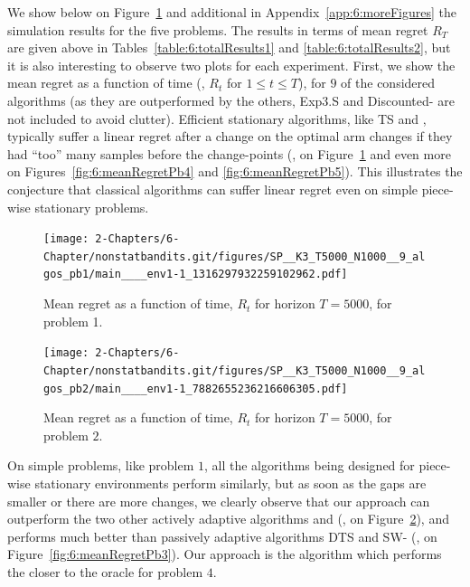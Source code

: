 We show below on Figure~\ref{fig:6:meanRegretPb1} and additional in Appendix~\ref{app:6:moreFigures} the simulation results for the five problems.
The results in terms of mean regret $R_T$ are given above in Tables~\ref{table:6:totalResults1} and \ref{table:6:totalResults2}, but it is also interesting to observe two plots for each experiment.
%
First, we show the mean regret as a function of time (\ie, $R_t$ for $1 \leq t \leq T$), for $9$ of the considered algorithms (as they are outperformed by the others, Exp3.S and Discounted-\klUCB{} are not included to avoid clutter).
%
Efficient stationary algorithms, like TS and \klUCB, typically suffer a linear regret after a change on the optimal arm changes if they had ``too'' many samples before the change-points (\eg, on Figure~\ref{fig:6:meanRegretPb1} and even more on Figures~\ref{fig:6:meanRegretPb4} and \ref{fig:6:meanRegretPb5}).
This illustrates the conjecture that classical algorithms can suffer linear regret even on simple piece-wise stationary problems.


\begin{figure}[h!]  %
    \centering
    \texttt{[image: 2-Chapters/6-Chapter/nonstatbandits.git/figures/SP\_\_K3\_T5000\_N1000\_\_9\_algos\_pb1/main\_\_\_\_env1-1\_1316297932259102962.pdf]}
    \caption{Mean regret as a function of time, $R_t$ for horizon $T = 5000$, for problem 1.}
    \label{fig:6:meanRegretPb1}
\end{figure}

\begin{figure}[h!]  %
    \centering
    \texttt{[image: 2-Chapters/6-Chapter/nonstatbandits.git/figures/SP\_\_K3\_T5000\_N1000\_\_9\_algos\_pb2/main\_\_\_\_env1-1\_7882655236216606305.pdf]}
    \caption{Mean regret as a function of time, $R_t$ for horizon $T = 5000$, for problem $2$.}
    \label{fig:6:meanRegretPb2}
\end{figure}

On simple problems, like problem $1$, all the algorithms being designed for piece-wise stationary environments perform similarly, but as soon as the gaps are smaller or there are more changes, we clearly observe that our approach \GLRklUCB{} can outperform the two other actively adaptive algorithms \CUSUMklUCB{} and \MklUCB{} (\eg, on Figure~\ref{fig:6:meanRegretPb2}), and performs much better than passively adaptive algorithms DTS and SW-\klUCB{}  (\eg, on Figure~\ref{fig:6:meanRegretPb3}).
Our approach is the algorithm which performs the closer to the oracle for problem $4$.

